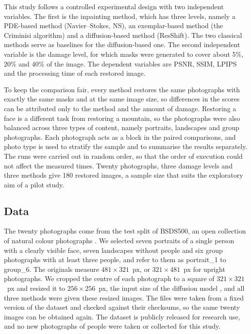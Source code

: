 \documentclass[conference]{IEEEtran}
\begin{document}
This study follows a controlled experimental design with two independent variables. The first is the inpainting method, which has three levels, namely a PDE-based method (Navier--Stokes, NS), an exemplar-based method (the Criminisi algorithm) and a diffusion-based method (ResShift). The two classical methods serve as baselines for the diffusion-based one. The second independent variable is the damage level, for which masks were generated to cover about 5\%, 20\% and 40\% of the image. The dependent variables are PSNR, SSIM, LPIPS and the processing time of each restored image.

To keep the comparison fair, every method restores the same photographs with exactly the same masks and at the same image size, so differences in the scores can be attributed only to the method and the amount of damage. Restoring a face is a different task from restoring a mountain, so the photographs were also balanced across three types of content, namely portraits, landscapes and group photographs. Each photograph acts as a block in the paired comparisons, and photo type is used to stratify the sample and to summarise the results separately. The runs were carried out in random order, so that the order of execution could not affect the measured times. Twenty photographs, three damage levels and three methods give 180 restored images, a sample size that suits the exploratory aim of a pilot study.

\subsection*{Data}

The twenty photographs come from the test split of BSDS500, an open collection of natural colour photographs \cite{bsds500}. We selected seven portraits of a single person with a clearly visible face, seven landscapes without people and six group photographs with at least three people, and refer to them as portrait\_1 to group\_6. The originals measure $481 \times 321$~px, or $321 \times 481$~px for upright photographs. We cropped the centre of each photograph to a square of $321 \times 321$~px and resized it to $256 \times 256$~px, the input size of the diffusion model \cite{yue2025}, and all three methods were given these resized images. The files were taken from a fixed version of the dataset and checked against their checksums, so the same twenty images can be obtained again. The dataset is publicly released for research use, and no new photographs of people were taken or collected for this study.
\end{document}
